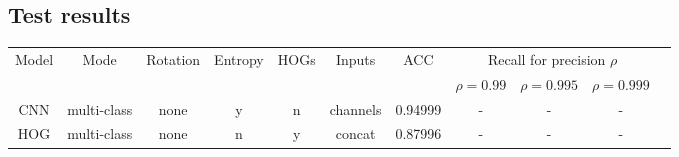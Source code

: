     \subsection{Test results}
        \begin{tabular}{ |c|c|c|c|c|c|c|c|c|c|c| }
            \hline
            \multirow{2}{*}{Model} &
            \multirow{2}{*}{Mode} &
            \multirow{2}{*}{Rotation} &
            \multirow{2}{*}{Entropy} &
            \multirow{2}{*}{HOGs} &
            \multirow{2}{*}{Inputs} &
            \multirow{2}{*}{ACC} &
            \multicolumn{3}{|c|}{Recall for precision $\rho$} \\
            & & & & & & & $\rho = 0.99$ & $\rho = 0.995$ & $\rho = 0.999$ \\
            \hline
            CNN & multi-class & none & y & n & channels & 0.94999 & - & - & - \\
            \hline
            HOG & multi-class & none & n & y & concat & 0.87996 & - & - & - \\
            \hline
        \end{tabular}
